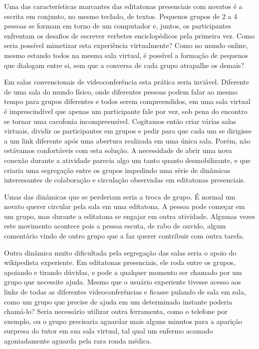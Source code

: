 Uma das características marcantes das editatonas presenciais com novatos é a escrita em conjunto, no mesmo teclado, de textos. Pequenos grupos de 2 a 4 pessoas se formam em torno de um computador e, juntos, os participantes enfrentam os desafios de escrever verbetes enciclopédicos pela primeira vez. Como seria possível mimetizar esta experiência virtualmente? Como no mundo online, mesmo estando todos na mesma sala virtual, é possível a formação de pequenos que dialogam entre si, sem que a conversa de cada grupo atrapalhe os demais?

Em salas convencionais de videoconferência esta prática seria inviável. Diferente de uma sala do mundo físico, onde diferentes pessoas podem falar ao mesmo tempo para grupos diferentes e todos serem compreendidos, em uma sala virtual é imprescindível que apenas um participante fale por vez, sob pena do encontro se tornar uma cacofonia incompreensível.
Cogitamos então criar várias salas virtuais, dividir os participantes em grupos e pedir para que cada um se dirigisse a um link diferente após uma abertura realizada em uma única sala. Porém, não estávamos confortáveis com esta solução. A necessidade de abrir uma nova conexão durante a atividade parecia algo um tanto quanto desmobilizante, e que criaria uma segregação entre os grupos impedindo uma série de dinâmicas interessantes de colaboração e circulação observadas em editatonas presenciais.

Umas das dinâmicas que se perderiam seria a troca de grupo. É normal um novato querer circular pela sala em uma editatona. A pessoa pode começar em um grupo, mas durante a editatona se engajar em outra atividade. Algumas vezes este movimento acontece pois a pessoa escuta, de rabo de ouvido, algum comentário vindo de outro grupo que a faz querer contribuir com outra tarefa.

Outra dinâmica muito dificultada pela segregação das salas seria o apoio do wikipedista experiente. Em editatonas presenciais, ele roda entre os grupos, apoiando e tirando dúvidas, e pode a qualquer momento ser chamado por um grupo que necessite ajuda. Mesmo que o usuário experiente tivesse acesso aos links de todas as diferentes videoconferências e ficasse pulando de sala em sala, como um grupo que precise de ajuda em um determinado instante poderia chamá-lo? Seria necessário utilizar outra ferramenta, como o telefone por exemplo, ou o grupo precisaria aguardar mais alguns minutos para a aparição surpresa do tutor em sua sala virtual, tal qual um enfermo acamado agoniadamente aguarda pela rara ronda médica.

